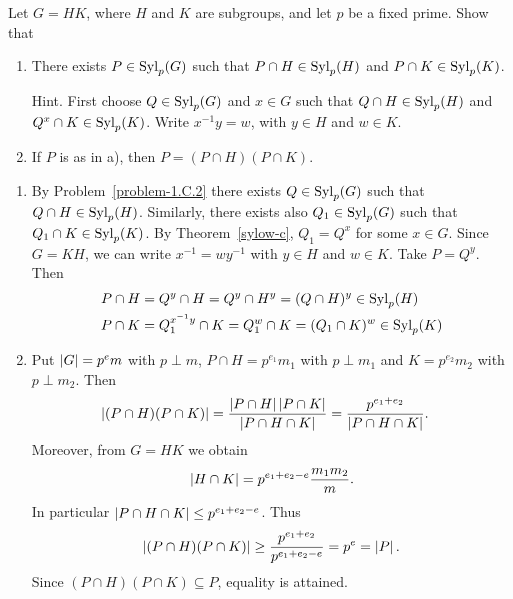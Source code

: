 \begin{probl}
    Let $G = HK$, where $H$ and $K$ are subgroups, and let $p$ be a fixed prime. Show that
    \begin{enumerate}[\rm a)]
        \item There exists $P\in{\rm Syl}_p(G)$ such that $P\cap H\in{\rm Syl}_p(H)$ and $P\cap K\in{\rm Syl}_p(K)$.
        
        \textrm{\rm Hint. First choose $Q\in{\rm Syl}_p(G)$ and $x\in G$ such that $Q\cap H\in{\rm Syl}_p(H)$ and $Q^x\cap K\in{\rm Syl}_p(K)$. Write $x^{-1}y=w$, with $y\in H$ and $w\in K$.}

        \item If $P$ is as in\/ {\rm a)}, then $P=(P\cap H)(P\cap K)$.
    \end{enumerate}
\end{probl}

\begin{solution}

\begin{enumerate}[\rm a)]
    \item By Problem~\ref{problem-1.C.2} there exists $Q\in{\rm Syl}_p(G)$ such that $Q\cap H\in{\rm Syl}_p(H)$. Similarly, there exists also $Q_1\in{\rm Syl}_p(G)$ such that $Q_1\cap K\in{\rm Syl}_p(K)$. By Theorem~\ref{sylow-c}, $Q_1=Q^x$ for some $x\in G$. Since $G=KH$, we can write $x^{-1}=wy^{-1}$ with $y\in H$ and $w\in K$. Take $P=Q^y$. Then
    \begin{align*}
        P\cap H &= Q^y\cap H = Q^y\cap H^y = (Q\cap H)^y\in{\rm Syl}_p(H)\\
        P\cap K &= Q_1^{x^{-1}y}\cap K = Q_1^w\cap K = (Q_1\cap K)^w\in{\rm Syl}_p(K)\\        
    \end{align*}

    \item Put $\left\vert{G}\right\vert=p^em$ with $p\perp m$, $P\cap H=p^{e_1}m_1$ with $p\perp m_1$ and $K=p^{e_2}m_2$ with $p\perp m_2$. Then
    \begin{align*}
        \left\vert{(P\cap H)(P\cap K)}\right\vert &= \frac{\left\vert{P\cap H}\right\vert\left\vert{P\cap K}\right\vert}
                {\left\vert{P\cap H\cap K}\right\vert}
            = \frac{p^{e_1+e_2}}{\left\vert{P\cap H\cap K}\right\vert}.
    \end{align*}
    Moreover, from $G=HK$ we obtain
    $$
        \left\vert{H\cap K}\right\vert = p^{e_1+e_2-e}\frac{m_1m_2}{m}.
    $$
    In particular $\left\vert{P\cap H\cap K}\right\vert\le p^{e_1+e_2-e}$. Thus
    $$
        \left\vert{(P\cap H)(P\cap K)}\right\vert \ge \frac{p^{e_1+e_2}}{p^{e_1+e_2-e}}=p^e=\left\vert{P}\right\vert.
    $$
    Since $(P\cap H)(P\cap K)\subseteq P$, equality is attained.
\end{enumerate}
\end{solution}


